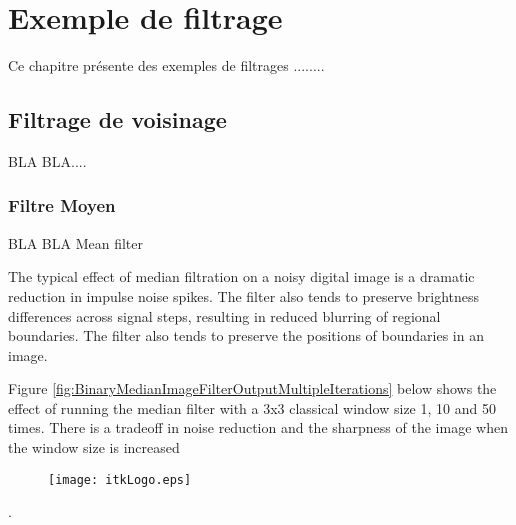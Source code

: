 \chapter{Exemple de filtrage}

Ce chapitre pr\'{e}sente des exemples de filtrages ........


\section{Filtrage de voisinage}
\label{sec:NeighborhoodFilters}

BLA BLA....


\subsection{Filtre Moyen}
\label{sec:MeanFilter}

\ifitkFullVersion

\fi

BLA BLA Mean filter


The typical effect of median filtration on a noisy digital image is a dramatic reduction in impulse noise spikes. The filter also tends to preserve brightness differences across signal steps, resulting in reduced blurring of regional boundaries. The filter also tends to preserve the positions of boundaries in an image.

Figure \ref{fig:BinaryMedianImageFilterOutputMultipleIterations} below shows the effect of running the median filter with a 3x3 classical window size 
1, 10 and 50 times. There is a tradeoff in noise reduction and the sharpness of the image when the window size is increased\begin{figure}
  \center
  \texttt{[image: itkLogo.eps]}
  \label{fig:itkLogo}
\end{figure}.






